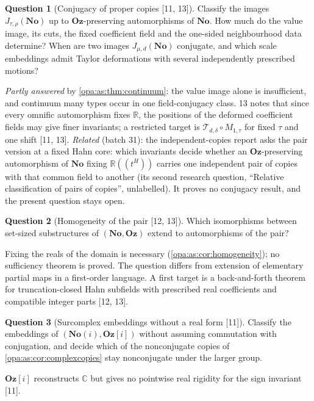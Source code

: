 \documentclass[11pt,oneside]{article}
\numberwithin{equation}{section}
\theoremstyle{definition}
\newtheorem{question}[question]{Question}
\theoremstyle{remark}
\newcommand{\No}{\mathbf{No}}
\newcommand{\Oz}{\mathbf{Oz}}
\newcommand{\Og}{\mathbf{Oz}[i]}
\newcommand{\SC}{\mathbf{No}(i)}
\newcommand{\R}{\mathbb R}
\newcommand{\C}{\mathbb C}
\newcommand{\Hahn}[2]{#1((t^{#2}))}
\newcommand{\src}[1]{\textup{\textsf{\small[#1]}}}
\begin{document}
\begin{question}[Conjugacy of proper copies \src{11, 13}]\label{opa:as:q:conjugacy}
Classify the images $J_{\tau,\rho}(\No)$ up to $\Oz$-preserving automorphisms of $\No$. How much do the value image, its
cuts, the fixed coefficient field and the one-sided neighbourhood data determine? When are two images $J_{\mu,d}(\No)$
conjugate, and which scale embeddings admit Taylor deformations with several independently prescribed motions?
\end{question}
\emph{Partly answered} by \cref{opa:as:thm:continuum}: the value image alone is insufficient, and continuum many types
occur in one field-conjugacy class. 13 notes that since every omnific automorphism fixes $\R$, the positions of the
deformed coefficient fields may give finer invariants; a restricted target is $\mathcal T_{d,\delta}\circ M_{1,\tau}$ for
fixed $\tau$ and one shift \src{11, 13}. \emph{Related} (batch 31): the independent-copies report asks the pair
version at a fixed Hahn core: which invariants decide whether an $\Oz$-preserving automorphism of $\No$ fixing
$\Hahn\R H$ carries one independent pair of copies with that common field to another (its second research question,
``Relative classification of pairs of copies'', unlabelled). It proves no conjugacy result, and the present
question stays open.

\begin{question}[Homogeneity of the pair \src{12, 13}]\label{opa:as:q:homogeneity}
Which isomorphisms between set-sized substructures of $(\No,\Oz)$ extend to automorphisms of the pair?
\end{question}
Fixing the reals of the domain is necessary (\cref{opa:as:cor:homogeneity}); no sufficiency theorem is proved. The
question differs from extension of elementary partial maps in a first-order language. A first target is a
back-and-forth theorem for truncation-closed Hahn subfields with prescribed real coefficients and compatible integer
parts \src{12, 13}.

\begin{question}[Surcomplex embeddings without a real form \src{11}]\label{opa:as:q:surcomplexembed}
Classify the embeddings of $(\SC,\Og)$ without assuming commutation with conjugation, and decide which of the
nonconjugate copies of \cref{opa:as:cor:complexcopies} stay nonconjugate under the larger group.
\end{question}
$\Og$ reconstructs $\C$ but gives no pointwise real rigidity for the sign invariant \src{11}.
\end{document}
